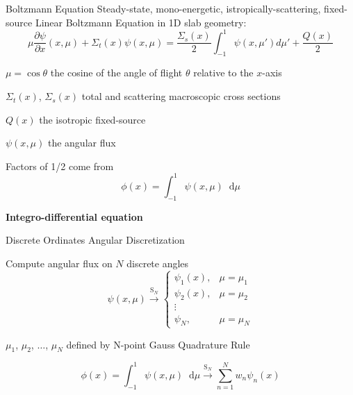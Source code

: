 \documentclass[10pt]{beamer}
\newcommand{\ud}{\mathop{}\!\mathrm{d}} %
\newcommand{\pderiv}[2]{\frac{\partial #1}{\partial #2}}
\begin{document}
\begin{frame}{Boltzmann Equation}
    Steady-state, mono-energetic, istropically-scattering, fixed-source Linear Boltzmann Equation in 1D slab geometry:
    \begin{equation*}
        \mu \pderiv{\psi}{x}(x, \mu) + \Sigma_t(x) \psi(x,\mu) = 
        \frac{\Sigma_s(x)}{2} \int_{-1}^{1} \psi(x, \mu') d\mu' + \frac{Q(x)}{2}
    \end{equation*}

    $\mu = \cos \theta$ the cosine of the angle of flight $\theta$ relative to the $x$-axis

    $\Sigma_t(x)$, $\Sigma_s(x)$ total and scattering macroscopic cross sections 

    $Q(x)$ the isotropic fixed-source

    $\psi(x,\mu)$ the angular flux 

    Factors of 1/2 come from 
        \begin{equation*}
            \phi(x) = \int_{-1}^{1} \psi(x,\mu) \ud \mu
        \end{equation*}

    \textbf{Integro-differential equation}

\end{frame}

\begin{frame}{Discrete Ordinates Angular Discretization}

    Compute angular flux on $N$ discrete angles 
        \begin{equation*}
            \psi(x,\mu) \xrightarrow{\text{S}_N} 
            \begin{cases}
                \psi_1(x), & \mu = \mu_1 \\ 
                \psi_2(x), & \mu = \mu_2 \\ 
                \vdots \\ 
                \psi_N, & \mu = \mu_N 
            \end{cases}
        \end{equation*}

    $\mu_1$, $\mu_2$, $\dots$, $\mu_N$ defined by N-point Gauss Quadrature Rule 

    \begin{equation*}
        \phi(x) = \int_{-1}^1 \psi(x, \mu) \ud\mu 
            \xrightarrow{\text{S}_N} \sum_{n=1}^N w_n \psi_n(x)
    \end{equation*}

\end{frame}
\end{document}

